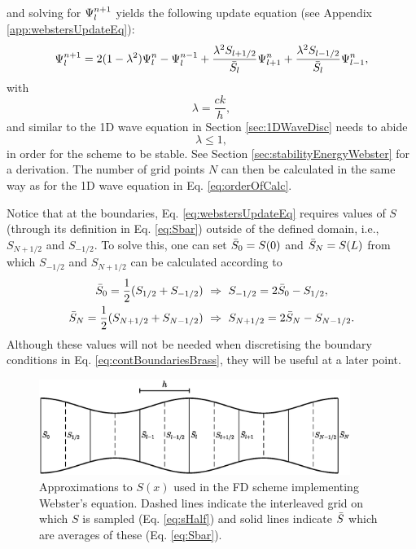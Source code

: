 and solving for $\Psi_l^{n+1}$ yields the following update equation (see Appendix \ref{app:webstersUpdateEq}):
\begin{equation}
    \Psi_l^{n+1} = 2(1-\lambda^2)\Psi_l^n-\Psi_l^{n-1}+ \frac{\lambda^2S_{l+1/2}}{\bar{S}_l}\Psi_{l+1}^n + \frac{\lambda^2S_{l-1/2}}{\bar{S}_l}\Psi_{l-1}^n,\label{eq:webstersUpdateEq}
\end{equation}
with 
\begin{equation}
    \lambda = \frac{ck}{h},
\end{equation}
and similar to the 1D wave equation in Section \ref{sec:1DWaveDisc} needs to abide
\begin{equation}\label{eq:CFLwebster}
    \lambda \leq 1,
\end{equation}
in order for the scheme to be stable. See Section \ref{sec:stabilityEnergyWebster} for a derivation. The number of grid points $N$ can then be calculated in the same way as for the 1D wave equation in Eq. \eqref{eq:orderOfCalc}.

Notice that at the boundaries, Eq. \eqref{eq:webstersUpdateEq} requires values of $S$ (through its definition in Eq. \eqref{eq:Sbar}) outside of the defined domain, i.e., $S_{N+1/2}$ and $S_{-1/2}$. To solve this, one can set $\bar{S}_0 = S(0)$ and $\bar{S}_N = S(L)$ from which $S_{-1/2}$ and $S_{N+1/2}$ can be calculated according to
\begin{subequations}
    \begin{align}
        \Sbar_0 = \frac{1}{2}(S_{1/2} + S_{-1/2}) \ &\Rightarrow \ S_{-1/2} = 2\Sbar_0 - S_{1/2},\\
        \Sbar_N = \frac{1}{2}(S_{N+1/2} + S_{N-1/2}) \ &\Rightarrow \ S_{N+1/2} = 2\Sbar_N - S_{N-1/2}.\label{eq:Snph}
    \end{align} 
\end{subequations}
Although these values will not be needed when discretising the boundary conditions in Eq. \eqref{eq:contBoundariesBrass}, they will be useful at a later point.

\begin{figure}[t]
    \centering
    \includegraphics[width=0.9\textwidth]{figures/resonators/brass/variableCrossSection.eps}
    \caption{Approximations to $S(x)$ used in the FD scheme implementing Webster's equation. Dashed lines indicate the interleaved grid on which $S$ is sampled (Eq. \eqref{eq:sHalf}) and solid lines indicate $\bar{S}$ which are averages of these (Eq. \eqref{eq:Sbar}). \label{fig:variableCrossSection}}
\end{figure}


